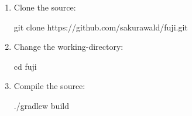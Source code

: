 \label{ch:development}


\begin{enumerate}
    \item Clone the source:
    \begin{sh}
        git clone https://github.com/sakurawald/fuji.git
    \end{sh}
    \item Change the working-directory:
    \begin{sh}
        cd fuji
    \end{sh}
    \item Compile the source:
    \begin{sh}
              ./gradlew build
    \end{sh}
\end{enumerate}
